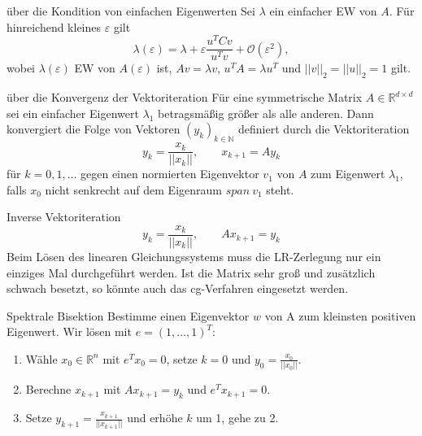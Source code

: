 
\begin{flashcard}[Satz]{über die Kondition von einfachen Eigenwerten}
Sei $\lambda$ ein einfacher EW von $A$. Für hinreichend kleines $\varepsilon$ gilt
$$\lambda(\varepsilon) = \lambda + \varepsilon \frac{u^TCv}{u^Tv} + \mathcal{O}(\varepsilon^2),$$
wobei $\lambda(\varepsilon)$ EW von $A(\varepsilon)$ ist, $Av = \lambda v$, $u^TA = \lambda u^T$ und $||v||_2 = ||u||_2 = 1$ gilt.
\end{flashcard}

\begin{flashcard}[Satz]{über die Konvergenz der Vektoriteration}
Für eine symmetrische Matrix $A \in \mathbb{R}^{d \times d}$ sei ein einfacher Eigenwert $\lambda_1$ betragsmäßig größer als alle anderen. Dann konvergiert die Folge von Vektoren $(y_k)_{k \in \mathbb{N}}$ definiert durch die Vektoriteration
$$y_k = \frac{x_k}{||x_k||}, \qquad x_{k+1} = Ay_k$$
für $k = 0, 1, \ldots $ gegen einen normierten Eigenvektor $v_1$ von $A$ zum Eigenwert $\lambda_1$, falls $x_0$ nicht senkrecht auf dem Eigenraum $span\ v_1$ steht.
\end{flashcard}

\begin{flashcard}{Inverse Vektoriteration}
$$y_k = \frac{x_k}{||x_k||}, \qquad Ax_{k+1} = y_k$$
Beim Lösen des linearen Gleichungssystems muss die LR-Zerlegung nur ein einziges Mal durchgeführt werden. Ist die Matrix sehr groß und zusätzlich schwach besetzt, so könnte auch das cg-Verfahren eingesetzt werden.
\end{flashcard}

\begin{flashcard}[Algorithmus]{Spektrale Bisektion}
Bestimme einen Eigenvektor $w$ von A zum kleinsten positiven Eigenwert. Wir lösen mit $e = (1, \ldots, 1)^T$:
\begin{enumerate}
	\item Wähle $x_0 \in \mathbb{R}^n$ mit $e^Tx_0 = 0$, setze $k = 0$ und $y_0 = \frac{x_0}{||x_0||}$.
	\item Berechne $x_{k+1}$ mit $Ax_{k+1} = y_k$ und $e^Tx_{k+1} = 0$.
	\item Setze $y_{k+1} = \frac{x_{k+1}}{||x_{k+1}||}$ und erhöhe $k$ um 1, gehe zu 2.
\end{enumerate}
\end{flashcard}
